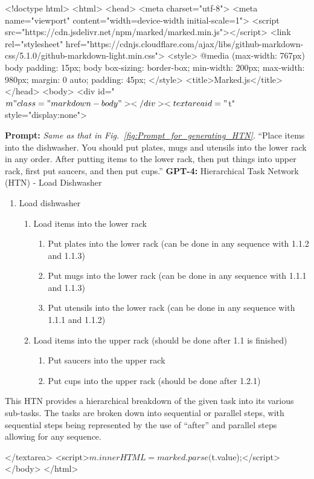 
<!doctype html>
<html>
<head>
  <meta charset="utf-8">
  <meta name="viewport" content="width=device-width initial-scale=1">
  <script src="https://cdn.jsdelivr.net/npm/marked/marked.min.js"></script>
  <link rel="stylesheet" href="https://cdnjs.cloudflare.com/ajax/libs/github-markdown-css/5.1.0/github-markdown-light.min.css">
  <style>
@media (max-width: 767px) { body { padding: 15px; } }
body { box-sizing: border-box;
       min-width: 200px;
       max-width: 980px;
       margin: 0 auto;
       padding: 45px; }
  </style>
  <title>Marked.js</title>
</head>
<body>
  <div id="$m" class="markdown-body"></div>
  <textarea id="$t" style="display:none">
\begin{tcolorbox}[breakable,title=Dialog 1: Generating HTN-like representation]
\textbf{Prompt:}
\textit{Same as that in Fig.~\ref{fig:Prompt_for_generating_HTN}}.
``Place items into the dishwasher. You should put plates, mugs and utensils into the lower rack in any order. After putting items to the lower rack, then put things into upper rack, first put saucers, and then put cups.''
\tcblower
\textbf{GPT-4:}
Hierarchical Task Network (HTN) - Load Dishwasher
\begin{enumerate}[label=\arabic*.]
    \item Load dishwasher
    \begin{enumerate}[label=\arabic{enumi}.\arabic*]
        \item Load items into the lower rack
        \begin{enumerate}[label=\arabic{enumi}.\arabic{enumii}.\arabic*]
            \item Put plates into the lower rack (can be done in any sequence with 1.1.2 and 1.1.3)
            \item Put mugs into the lower rack (can be done in any sequence with 1.1.1 and 1.1.3)
            \item Put utensils into the lower rack (can be done in any sequence with 1.1.1 and 1.1.2)
        \end{enumerate}
        \item Load items into the upper rack (should be done after 1.1 is finished)
        \begin{enumerate}[label=\arabic{enumi}.\arabic{enumii}.\arabic*]
            \item Put saucers into the upper rack 
            \item Put cups into the upper rack (should be done after 1.2.1)
        \end{enumerate}
    \end{enumerate}
\end{enumerate}

{This HTN provides a hierarchical breakdown of the given task into its various sub-tasks. The tasks are broken down into sequential or parallel steps, with sequential steps being represented by the use of ``after'' and parallel steps allowing for any sequence.}

\end{tcolorbox}

  </textarea>
  <script>$m.innerHTML = marked.parse($t.value);</script>
</body>
</html>
